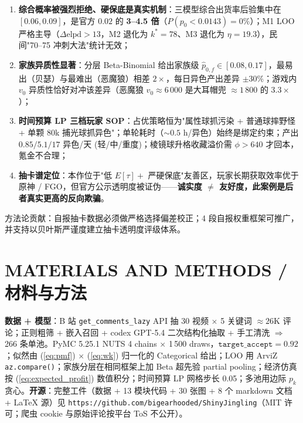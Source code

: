 \documentclass[journal]{IEEEtran}
\begin{document}
\begin{enumerate}
    \item \textbf{综合概率被强烈拒绝、硬保底是真实机制}：三模型综合出货率后验集中在 $[0.06, 0.09]$，是官方 $0.02$ 的 \textbf{3--4.5 倍}（$P(p_0 < 0.0143) = 0\%$）；M1 LOO 严格主导（$\Delta\text{elpd} > 13$，M2 退化为 $k^* = 78$、M3 退化为 $\eta = 19.3$），民间"70--75 冲刺大法"统计无效；
    \item \textbf{家族异质性显著}：分层 Beta-Binomial 给出家族级 $\hat p_{0,f} \in [0.08, 0.17]$，最易出（贝瑟）与最难出（恶魔狼）相差 $2\times$，每日异色产出差异 $\pm 30\%$；游戏内 $v_0$ 异质性恰好对冲该差异（恶魔狼 $v_0 \approx 6\,000$ 是大耳帽兜 $\approx 1\,800$ 的 $3.3\times$）；
    \item \textbf{时间预算 LP 三档玩家 SOP}：占优策略恒为"属性球抓污染 + 普通球摔野怪 + 单颗 $80$k 捕光球抓异色"；单轮耗时（$\sim 0.5$ h/异色）始终是绑定约束；产出 $0.85 / 5.1 / 17$ 异色/天 (轻/中/重度)；棱镜球升格收藏溢价需 $\phi > 640$ 才回本，氪金不合理；
    \item \textbf{抽卡谱定位}：本作位于"低 $E[\tau] + $ 严硬保底"友善区，玩家长期获取效率优于原神 / FGO，但官方公示透明度被证伪——\textbf{诚实度 $\ne$ 友好度，此案例是后者真实更高的反向欺骗}。
\end{enumerate}

方法论贡献：自报抽卡数据必须做严格选择偏差校正；4 段自报权重框架可推广，并支持以贝叶斯严谨度建立抽卡透明度评级体系。


\section{MATERIALS AND METHODS / 材料与方法}

\textbf{数据 + 模型}：B 站 \texttt{get\_comments\_lazy} API 抽 30 视频 $\times$ 5 关键词 $\approx 26$K 评论；正则粗筛 + 嵌入召回 + codex GPT-5.4 二次结构化抽取 + 手工清洗 $\Rightarrow$ 266 条单池。PyMC 5.25.1\cite{ref_pymc} NUTS 4 chains $\times$ 1\,500 draws，$\texttt{target\_accept}=0.92$；似然由 (\ref{eq:pmf}) $\times$ (\ref{eq:wk}) 归一化的 Categorical 给出；LOO 用 ArviZ \texttt{az.compare()}\cite{ref_loo}；家族分层在相同框架上加 Beta 超先验 partial pooling\cite{ref_self_report_bias}；经济仿真按 (\ref{eq:expected_profit}) 数值积分；时间预算 LP 网格步长 0.05；多池用边际 $p_k$ 贪心。\textbf{开源}：完整工件（数据 + 13 模块代码 + 30 张图 + 8 个 markdown 文档 + LaTeX 源）见 \texttt{https://github.com/bigearhooded/ShinyJingling}（MIT 许可；爬虫 cookie 与原始评论按平台 ToS 不公开）。\\
\end{document}
